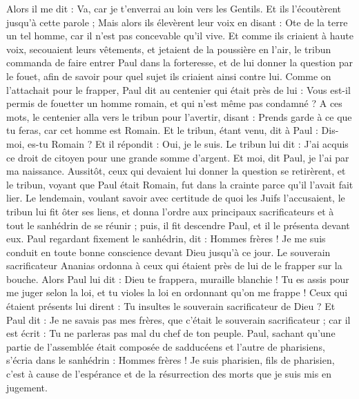 \begin{multicols}{2}
Alors il me dit : Va, car je t'enverrai au loin vers les Gentils.
Et ils l'écoutèrent jusqu'à cette parole ; Mais alors ils élevèrent leur voix en disant : Ote de la terre un tel homme, car il n'est pas concevable qu'il vive.
Et comme ils criaient à haute voix, secouaient leurs vêtements, et jetaient de la poussière en l'air,
le tribun commanda de faire entrer Paul dans la forteresse, et de lui donner la question par le fouet, afin de savoir pour quel sujet ils criaient ainsi contre lui.
Comme on l'attachait pour le frapper, Paul dit au centenier qui était près de lui : Vous est-il permis de fouetter un homme romain, et qui n'est même pas condamné ?
A ces mots, le centenier alla vers le tribun pour l'avertir, disant : Prends garde à ce que tu feras, car cet homme est Romain.
Et le tribun, étant venu, dit à Paul : Dis-moi, es-tu Romain ? Et il répondit : Oui, je le suis.
Le tribun lui dit : J'ai acquis ce droit de citoyen pour une grande somme d'argent. Et moi, dit Paul, je l'ai par ma naissance.
Aussitôt, ceux qui devaient lui donner la question se retirèrent, et le tribun, voyant que Paul était Romain, fut dans la crainte parce qu'il l'avait fait lier.
Le lendemain, voulant savoir avec certitude de quoi les Juifs l'accusaient, le tribun lui fit ôter ses liens, et donna l'ordre aux principaux sacrificateurs et à tout le sanhédrin de se réunir ; puis, il fit descendre Paul, et il le présenta devant eux.
\VerseOne{}Paul regardant fixement le sanhédrin, dit : Hommes frères ! Je me suis conduit en toute bonne conscience devant Dieu jusqu'à ce jour.
Le souverain sacrificateur Ananias ordonna à ceux qui étaient près de lui de le frapper sur la bouche.
Alors Paul lui dit : Dieu te frappera, muraille blanchie ! Tu es assis pour me juger selon la loi, et tu violes la loi en ordonnant qu'on me frappe !
Ceux qui étaient présents lui dirent : Tu insultes le souverain sacrificateur de Dieu ?
Et Paul dit : Je ne savais pas mes frères, que c'était le souverain sacrificateur ; car il est écrit : Tu ne parleras pas mal du chef de ton peuple.
Paul, sachant qu'une partie de l'assemblée était composée de sadducéens et l'autre de pharisiens, s'écria dans le sanhédrin : Hommes frères ! Je suis pharisien, fils de pharisien, c'est à cause de l'espérance et de la résurrection des morts que je suis mis en jugement.

\end{multicols}
